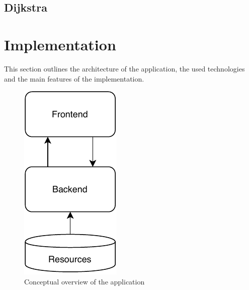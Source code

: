 \documentclass[a4paper]{article}
\begin{document}
\subsection{Dijkstra}
\section{Implementation}
This section outlines the architecture of the application, the used technologies and the main features of the implementation.
\begin{figure}
    \centering
    \includegraphics[scale=1]{figures/arch}
    \caption{Conceptual overview of the application}
    \label{fig:arch}
\end{figure}
\end{document}

